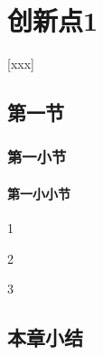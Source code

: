 \chapter{创新点1}
[xxx]

\section{第一节}

\subsection{第一小节}

\subsubsection{第一小小节}


{\large{}} 1

{\large{}} 2

{\large{}} 3


\section{本章小结}
